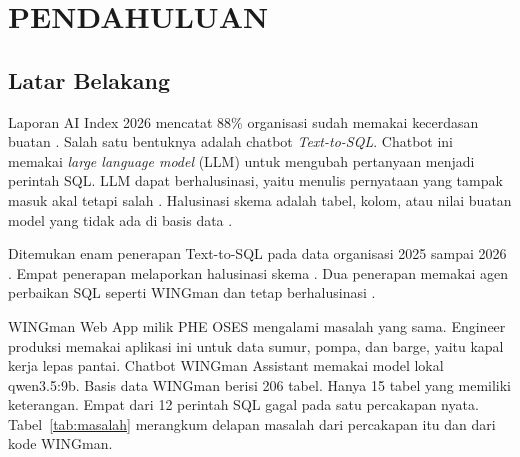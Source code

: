 \cleardoublepage %
\chapter{PENDAHULUAN}
\label{chap:pendahuluan}
\section{Latar Belakang}
Laporan AI Index 2026 mencatat 88\% organisasi sudah memakai kecerdasan buatan \autocite{hai2026aiindex}. Salah satu bentuknya adalah chatbot \emph{Text-to-SQL}. Chatbot ini memakai \emph{large language model} (LLM) untuk mengubah pertanyaan menjadi perintah SQL. LLM dapat berhalusinasi, yaitu menulis pernyataan yang tampak masuk akal tetapi salah \autocite{kalai2025whylanguagemodelshallucinate}. Halusinasi skema adalah tabel, kolom, atau nilai buatan model yang tidak ada di basis data \autocite{qu2024tasql,shen2026understanding}.

Ditemukan enam penerapan Text-to-SQL pada data organisasi 2025 sampai 2026 \autocite{chen2025texttosqlenterprisedataanalytics,chen2025adeptsql,gwimm2026beyondharness,he2026oilragsql,macedo2026twolayer,menon2025fisql}. Empat penerapan melaporkan halusinasi skema \autocite{chen2025texttosqlenterprisedataanalytics,gwimm2026beyondharness,he2026oilragsql,macedo2026twolayer}. Dua penerapan memakai agen perbaikan SQL seperti WINGman dan tetap berhalusinasi \autocite{chen2025texttosqlenterprisedataanalytics,macedo2026twolayer}.

WINGman Web App milik PHE OSES mengalami masalah yang sama. Engineer produksi memakai aplikasi ini untuk data sumur, pompa, dan barge, yaitu kapal kerja lepas pantai. Chatbot WINGman Assistant memakai model lokal qwen3.5:9b. Basis data WINGman berisi 206 tabel. Hanya 15 tabel yang memiliki keterangan. Empat dari 12 perintah SQL gagal pada satu percakapan nyata. Tabel~\ref{tab:masalah} merangkum delapan masalah dari percakapan itu dan dari kode WINGman.


